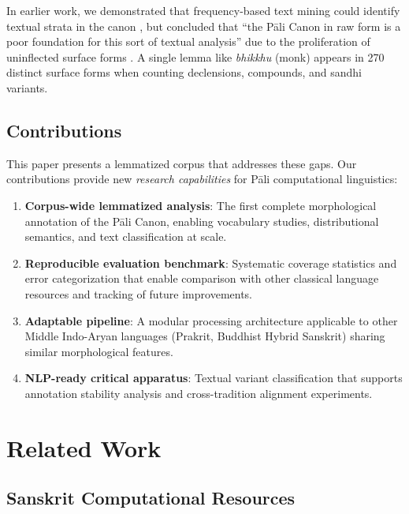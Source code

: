 \documentclass[11pt,twocolumn]{article}
\begin{document}
In earlier work, we demonstrated that frequency-based text mining could identify textual strata in the canon \citep{zigmond2021,zigmond2023}, but concluded that ``the Pāli Canon in raw form is a poor foundation for this sort of textual analysis'' due to the proliferation of uninflected surface forms \citep{zigmond2023}. A single lemma like \emph{bhikkhu} (monk) appears in 270 distinct surface forms when counting declensions, compounds, and sandhi variants.

\subsection{Contributions}

This paper presents a lemmatized corpus that addresses these gaps. Our contributions provide new \emph{research capabilities} for Pāli computational linguistics:

\begin{enumerate}
\item \textbf{Corpus-wide lemmatized analysis}: The first complete morphological annotation of the Pāli Canon, enabling vocabulary studies, distributional semantics, and text classification at scale.

\item \textbf{Reproducible evaluation benchmark}: Systematic coverage statistics and error categorization that enable comparison with other classical language resources and tracking of future improvements.

\item \textbf{Adaptable pipeline}: A modular processing architecture applicable to other Middle Indo-Aryan languages (Prakrit, Buddhist Hybrid Sanskrit) sharing similar morphological features.

\item \textbf{NLP-ready critical apparatus}: Textual variant classification that supports annotation stability analysis and cross-tradition alignment experiments.
\end{enumerate}

\section{Related Work}
\label{sec:related}

\subsection{Sanskrit Computational Resources}
\end{document}
